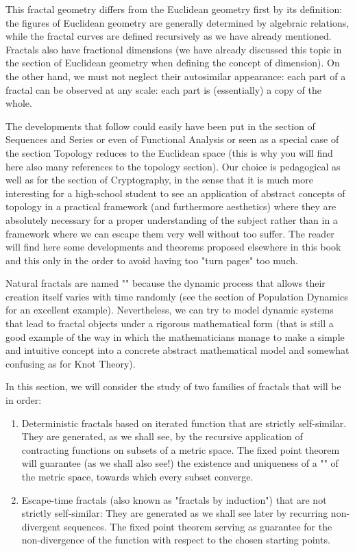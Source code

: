 	This fractal geometry differs from the Euclidean geometry first by its definition: the figures of Euclidean geometry are generally determined by algebraic relations, while the fractal curves are defined recursively as we have already mentioned. Fractals also have fractional dimensions (we have already discussed this topic in the section of Euclidean geometry when defining the concept of dimension). On the other hand, we must not neglect their autosimilar appearance: each part of a fractal can be observed at any scale: each part is (essentially) a copy of the whole.
	
	\begin{tcolorbox}[title=Remark,colframe=black,arc=10pt]
	The developments that follow could easily have been put in the section of Sequences and Series or even of Functional Analysis or seen as a special case of the section Topology reduces to the Euclidean space (this is why you will find here also many references to the topology section). Our choice is pedagogical as well as for the section of Cryptography, in the sense that it is much more interesting for a high-school student to see an application of abstract concepts of topology in a practical framework (and furthermore aesthetics) where they are absolutely necessary for a proper understanding of the subject rather than in a framework where we can escape them very well without too suffer. The reader will find here some developments and theorems proposed elsewhere in this book and this only in the order to avoid having too "turn pages" too much.
	\end{tcolorbox}	
	
	Natural fractals are named "" because the dynamic process that allows their creation itself varies with time randomly (see the section of Population Dynamics for an excellent example). Nevertheless, we can try to model dynamic systems that lead to fractal objects under a rigorous mathematical form (that is still a good example of the way in which the mathematicians manage to make a simple and intuitive concept into a concrete abstract mathematical model and somewhat confusing as for Knot Theory).
	
	In this section, we will consider the study of two families of fractals that will be in order:
	\begin{enumerate}
		\item Deterministic fractals based on iterated function that are strictly self-similar. They are generated, as we shall see, by the recursive application of contracting functions on subsets of a metric space. The fixed point theorem will guarantee (as we shall also see!) the existence and uniqueness of a "" of the metric space, towards which every subset converge.
		
		\item Escape-time fractals (also known as "fractals by induction") that are not strictly self-similar: They are generated as we shall see later by recurring non-divergent sequences. The fixed point theorem serving as guarantee for the non-divergence of the function with respect to the chosen starting points.
	\end{enumerate}
	
